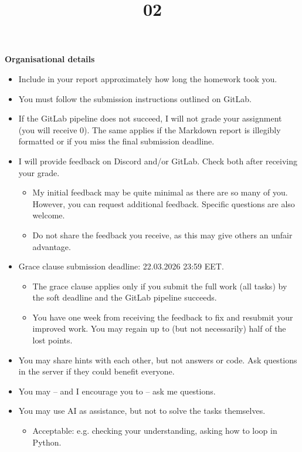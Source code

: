 \documentclass{homework}
\title{02}
\begin{document}
\maketitle

\textbf{Organisational details}

\begin{itemize}
  \item Include in your report approximately how long the homework took you.
  \item You must follow the submission instructions outlined on GitLab.
  \item If the GitLab pipeline does not succeed, I will not grade your assignment (you will receive 0).
  The same applies if the Markdown report is illegibly formatted or if you miss the final submission deadline.
  \item I will provide feedback on Discord and/or GitLab.
  Check both after receiving your grade.
  \begin{itemize}
    \item My initial feedback may be quite minimal as there are so many of you.
    However, you can request additional feedback.
    Specific questions are also welcome.
    \item Do not share the feedback you receive, as this may give others an unfair advantage.
  \end{itemize}
  \item Grace clause submission deadline: 22.03.2026 23:59 EET.
  \begin{itemize}
    \item The grace clause applies only if you submit the full work (all tasks) by the soft deadline and the GitLab pipeline succeeds.
    \item You have one week from receiving the feedback to fix and resubmit your improved work.
    You may regain up to (but not necessarily) half of the lost points.
  \end{itemize}
  \item You may share hints with each other, but not answers or code.
  Ask questions in the server if they could benefit everyone.
  \item You may -- and I encourage you to -- ask me questions.
  \item You may use AI as assistance, but not to solve the tasks themselves.
  \begin{itemize}
    \item Acceptable: e.g. checking your understanding, asking how to loop in Python.

\end{itemize}
\end{itemize}
\end{document}
